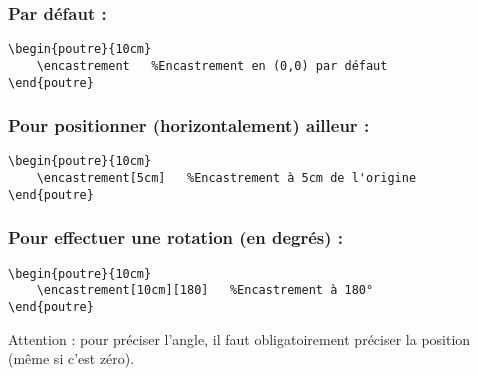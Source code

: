 \documentclass[a4paper,10pt]{article}
\begin{document}
	\subsubsection{Par défaut :}
	
        \begin{verbatim}
\begin{poutre}{10cm}
    \encastrement   %Encastrement en (0,0) par défaut
\end{poutre}
        \end{verbatim}

\begin{poutre}{10cm}
    \encastrement   %
\end{poutre}


        \subsubsection{Pour positionner (horizontalement) ailleur :}
       
        \begin{verbatim}
\begin{poutre}{10cm}
    \encastrement[5cm]   %Encastrement à 5cm de l'origine
\end{poutre}
        \end{verbatim}

\begin{poutre}{10cm}
    \encastrement[5cm]  %
\end{poutre}
	

        \subsubsection{Pour effectuer une rotation (en degrés) :}
       
        \begin{verbatim}
\begin{poutre}{10cm}
    \encastrement[10cm][180]   %Encastrement à 180°
\end{poutre}
        \end{verbatim}

\begin{poutre}{10cm}
    \encastrement[10cm][180]   %
\end{poutre}

    Attention : pour préciser l'angle, il faut obligatoirement préciser la position (même si c'est zéro).
	
\end{document}
